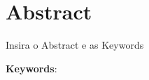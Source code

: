 \chapter*{ Abstract}

Insira o Abstract e as Keywords


\vspace{.5cm}
\textbf{Keywords}:\palavraschaves

